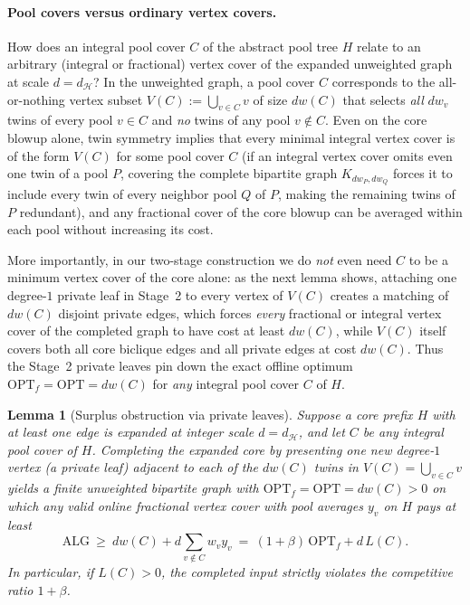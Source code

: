 \documentclass[11pt,letterpaper]{article}
\newtheorem{lemma}{Lemma}[section]
\begin{document}
\paragraph{Pool covers versus ordinary vertex covers.}
How does an integral pool cover $C$ of the abstract pool tree $H$ relate to an arbitrary (integral or fractional) vertex cover of the expanded unweighted graph at scale $d=d_{\mathcal H}$? In the unweighted graph, a pool cover $C$ corresponds to the all-or-nothing vertex subset $V(C) := \bigcup_{v\in C} v$ of size $d w(C)$ that selects \emph{all} $d w_v$ twins of every pool $v\in C$ and \emph{no} twins of any pool $v\notin C$. Even on the core blowup alone, twin symmetry implies that every minimal integral vertex cover is of the form $V(C)$ for some pool cover $C$ (if an integral vertex cover omits even one twin of a pool $P$, covering the complete bipartite graph $K_{d w_P, d w_Q}$ forces it to include every twin of every neighbor pool $Q$ of $P$, making the remaining twins of $P$ redundant), and any fractional cover of the core blowup can be averaged within each pool without increasing its cost.

More importantly, in our two-stage construction we do \emph{not} even need $C$ to be a minimum vertex cover of the core alone: as the next lemma shows, attaching one degree-$1$ private leaf in Stage~2 to every vertex of $V(C)$ creates a matching of $d w(C)$ disjoint private edges, which forces \emph{every} fractional or integral vertex cover of the completed graph to have cost at least $d w(C)$, while $V(C)$ itself covers both all core biclique edges and all private edges at cost $d w(C)$. Thus the Stage~2 private leaves pin down the exact offline optimum $\mathrm{OPT}_f = \mathrm{OPT} = d w(C)$ for \emph{any} integral pool cover $C$ of $H$.

\begin{lemma}[Surplus obstruction via private leaves]\label{lem:surplus}
Suppose a core prefix $H$ with at least one edge is expanded at integer scale $d=d_{\mathcal H}$, and let $C$ be any integral pool cover of $H$. Completing the expanded core by presenting one new degree-$1$ vertex (a \emph{private leaf}) adjacent to each of the $d w(C)$ twins in $V(C)=\bigcup_{v\in C} v$ yields a finite unweighted bipartite graph with $\mathrm{OPT}_f = \mathrm{OPT} = d w(C) > 0$ on which any valid online fractional vertex cover with pool averages $y_v$ on $H$ pays at least
\[
  \mathrm{ALG}\ \ge\ d w(C) + d\sum_{v\notin C} w_v y_v\ =\ (1+\beta)\,\mathrm{OPT}_f + d\,L(C).
\]
In particular, if $L(C)>0$, the completed input strictly violates the competitive ratio $1+\beta$.
\end{lemma}
\end{document}
